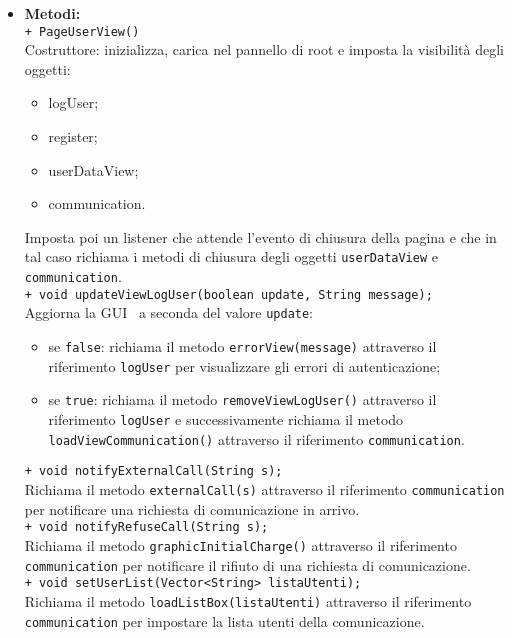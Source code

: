 {\begin{sloppypar}
{\begin{itemize}
\begin{itemize}
			\item[] \textbf{Metodi:}\\
			\texttt{+ PageUserView()}\\
			Costruttore: inizializza, carica nel pannello di root e imposta la visibilità degli oggetti:
			\begin{itemize}
				\item logUser;
				\item register;
				\item userDataView;
				\item communication.
			\end{itemize}
			Imposta poi un listener che attende l’evento di chiusura della pagina e che in tal caso richiama i metodi di chiusura degli oggetti \texttt{userDataView} e \texttt{communication}.\\
			
			\texttt{+ void updateViewLogUser(boolean update, String message);}\\
			Aggiorna la GUI\g~ a seconda del valore \texttt{update}:
			\begin{itemize}
				\item se \texttt{false}: richiama il metodo \texttt{errorView(message)} attraverso il riferimento \texttt{logUser} per visualizzare gli errori di autenticazione;
				\item se \texttt{true}: richiama il metodo \texttt{removeViewLogUser()} attraverso il riferimento \texttt{logUser} e successivamente richiama il metodo \texttt{loadViewCommunication()} attraverso il riferimento \texttt{communication}.\\
			\end{itemize}
			
			\texttt{+ void notifyExternalCall(String s);}\\
			Richiama il metodo \texttt{externalCall(s)} attraverso il riferimento \texttt{communication} per notificare una richiesta di comunicazione in arrivo.\\
			
			\texttt{+ void notifyRefuseCall(String s);}\\
			Richiama il metodo \texttt{graphicInitialCharge()} attraverso il riferimento \texttt{communication} per notificare il rifiuto di una richiesta di comunicazione.\\
			
			\texttt{+ void setUserList(Vector<String> listaUtenti);}\\
			Richiama il metodo \texttt{loadListBox(listaUtenti)} attraverso il riferimento \texttt{communication} per impostare la lista utenti della comunicazione.\\


\end{itemize}
\end{itemize}}
\end{sloppypar}}
